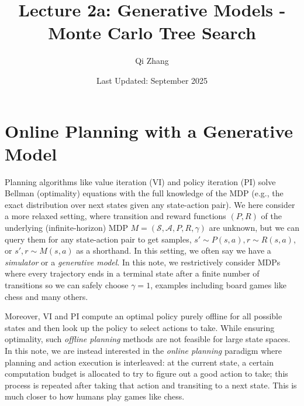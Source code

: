 \title{Lecture 2a: Generative Models - Monte Carlo Tree Search}
\author{Qi Zhang}
\date{Last Updated: September 2025}

\section{Online Planning with a Generative Model}
Planning algorithms like value iteration (VI) and policy iteration (PI) solve Bellman (optimality) equations with the full knowledge of the MDP (e.g., the exact distribution over next states given any state-action pair).
We here consider a more relaxed setting, where transition and reward functions $(P, R)$ of the underlying (infinite-horizon) MDP $M=(\mathcal{S},\mathcal{A},P,R,\gamma)$ are unknown, but we can query them for any state-action pair to get samples, $s'\sim P(s,a), r\sim R(s,a)$, or $s',r\sim M(s,a)$ as a shorthand.
In this setting, we often say we have a {\em simulator} or a {\em generative model}.
In this note, we restrictively consider MDPs where every trajectory ends in a terminal state after a finite number of transitions so we can safely choose $\gamma=1$, examples including board games like chess and many others.

Moreover, VI and PI compute an optimal policy purely offline for all possible states and then look up the policy to select actions to take. While ensuring optimality, such {\em offline planning} methods are not feasible for large state spaces.
In this note, we are instead interested in the {\em online planning} paradigm where planning and action execution is interleaved: 
at the current state, a certain computation budget is allocated to try to figure out a good action to take; this process is repeated after taking that action and transiting to a next state.
This is much closer to how humans play games like chess.

